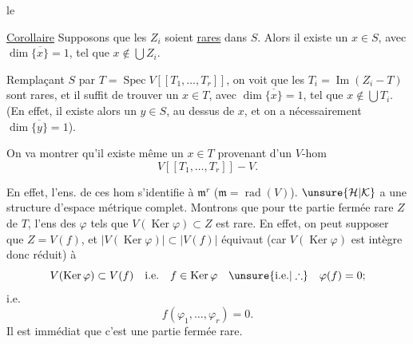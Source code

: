 le

\uline{Corollaire} Supposons que les $Z_i$ soient \uline{rares} dans $S$. Alors il existe un $x\in S$, avec $\dim\overline{\{x\}}=1$, tel que $x\notin\bigcup Z_i$.

Remplaçant $S$ par $T=\operatorname{Spec}V[[T_1,\ldots,T_r]]$,  on voit que les $T_i=\operatorname{Im}(Z_i\mathbin{-}T)$ sont rares, et il suffit de trouver un $x\in T$, avec $\dim\overline{\{x\}}=1$, tel que $x\notin\bigcup T_i$. (En effet, il existe alors un $y\in S$, au dessus de $x$, et on a nécessairement $\dim\overline{\{y\}}=1$).

On va montrer qu'il existe même un $x\in T$ provenant d'un $V$-hom
\[
V[[T_1,\ldots,T_r]]\mathbin{-}V.
\]

En effet, l'ens. de ces hom s'identifie à $\mathfrak m^r$ ($\mathfrak m=\operatorname{rad}(V)$). $\unsure{\mathcal H|\mathcal K}$ a une structure d'espace métrique complet. Montrons que pour tte partie fermée rare $Z$ de $T$, l'ens des $\varphi$ tels que $V(\operatorname{Ker}\varphi)\subset Z$ est rare. En effet, on peut supposer que  $Z=V(f)$,  et $|V(\operatorname{Ker}\varphi)|\subset|V(f)|$ équivaut (car $V(\operatorname{Ker}\varphi)$ est intègre donc réduit) à
\[
V(\operatorname{Ker}\varphi)\subset V(f)\quad\text{i.e.}\quad f\in\operatorname{Ker}\varphi\quad\unsure{\text{i.e.}|\therefore}\quad\varphi(f)=0;
\]
i.e.
\[
f(\varphi_1,\ldots,\varphi_r)=0.
\]
Il est immédiat que c'est une partie fermée rare.

